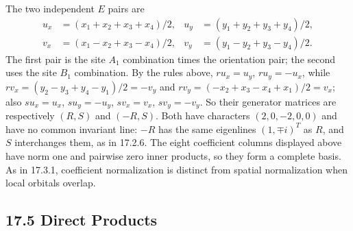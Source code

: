 The two independent $E$ pairs are
\[
\boxed{\begin{aligned}
u_x&=(x_1+x_2+x_3+x_4)/2,&
u_y&=(y_1+y_2+y_3+y_4)/2,\\
v_x&=(x_1-x_2+x_3-x_4)/2,&
v_y&=(y_1-y_2+y_3-y_4)/2.
\end{aligned}}
\]
The first pair is the site $A_1$ combination times the orientation
pair; the second uses the site $B_1$ combination.
By the rules above, $ru_x=u_y$, $ru_y=-u_x$, while
$rv_x=(y_2-y_3+y_4-y_1)/2=-v_y$ and
$rv_y=(-x_2+x_3-x_4+x_1)/2=v_x$; also $su_x=u_x$, $su_y=-u_y$,
$sv_x=v_x$, $sv_y=-v_y$. So their generator matrices are
respectively $(R,S)$ and $(-R,S)$. Both have characters
$(2,0,-2,0,0)$ and have no common invariant line: $-R$ has the same
eigenlines $(1,\mp i)^T$ as $R$, and $S$ interchanges them, as in
17.2.6.
The eight coefficient columns displayed above have norm one
and pairwise zero inner products, so they form a complete basis.
As in 17.3.1, coefficient normalization is distinct from spatial
normalization when local orbitals overlap.

\subsection*{17.5 Direct Products}

